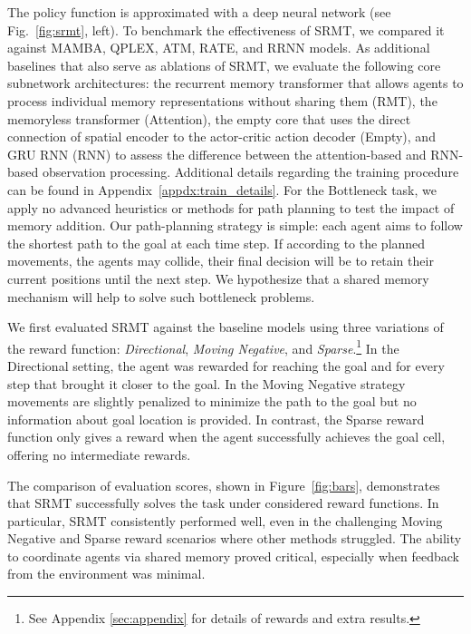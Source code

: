 \documentclass{article} %
\begin{document}
The policy function is approximated with a deep neural network (see Fig.~\ref{fig:srmt}, left). To benchmark the effectiveness of SRMT, we compared it against MAMBA, QPLEX, ATM, RATE, and RRNN models. As additional baselines that also serve as ablations of SRMT, we evaluate the following core subnetwork architectures: the recurrent memory transformer that allows agents to process individual memory representations without sharing them (RMT), the memoryless transformer (Attention), the empty core that uses the direct connection of spatial encoder to the actor-critic action decoder (Empty), and GRU RNN (RNN) to assess the difference between the attention-based and RNN-based observation processing. Additional details regarding the training procedure can be found in Appendix~\ref{appdx:train_details}. For the Bottleneck task, we apply no advanced heuristics or methods for path planning to test the impact of memory addition. Our path-planning strategy is simple: each agent aims to follow the shortest path to the goal at each time step. If according to the planned movements, the agents may collide, their final decision will be to retain their current positions until the next step. We hypothesize that a shared memory mechanism will help to solve such bottleneck problems.


We first evaluated SRMT against the baseline models using three variations of the reward function: \textit{Directional}, \textit{Moving Negative}, and \textit{Sparse}.\footnote{See Appendix \ref{sec:appendix} for details of rewards and extra results.} In the Directional setting, the agent was rewarded for reaching the goal and for every step that brought it closer to the goal. In the Moving Negative strategy movements are slightly penalized to minimize the path to the goal but no information about goal location is provided. In contrast, the Sparse reward function only gives a reward when the agent successfully achieves the goal cell, offering no intermediate rewards.

The comparison of evaluation scores, shown in Figure~\ref{fig:bars}, demonstrates that SRMT successfully solves the task under considered reward functions. In particular, SRMT consistently performed well, even in the challenging Moving Negative and Sparse reward scenarios where other methods struggled. The ability to coordinate agents via shared memory proved critical, especially when feedback from the environment was minimal.
\end{document}

